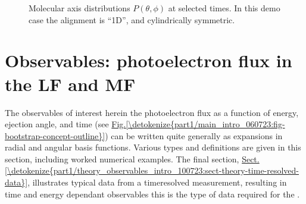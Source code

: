\documentclass[letterpaper,table,10pt,english]{jupyterBook}
\begin{document}
\begin{figure}[htbp]
\centering
\capstart

\noindent{}
\caption{Molecular axis distributions \(P(\theta,\phi)\) at selected times. In this demo case the alignment is “1D”, and cylindrically symmetric.}\label{\detokenize{part1/theory_molecular_alignment_170723:fig-axisdistdemo}}\end{figure}

\sphinxstepscope


\section{Observables: photoelectron flux in the LF and MF}
\label{\detokenize{part1/theory_observables_intro_100723:observables-photoelectron-flux-in-the-lf-and-mf}}\label{\detokenize{part1/theory_observables_intro_100723:sect-theory-observables}}\label{\detokenize{part1/theory_observables_intro_100723::doc}}
\sphinxAtStartPar
The observables of interest herein \sphinxhyphen{} the photoelectron flux as a function of energy, ejection angle, and time (see \hyperref[\detokenize{part1/main_intro_060723:fig-bootstrap-concept-outline}]{Fig.\@ \ref{\detokenize{part1/main_intro_060723:fig-bootstrap-concept-outline}}}) \sphinxhyphen{} can be written quite generally as expansions in radial and angular basis functions. Various types and definitions are given in this section, including worked numerical examples. The final section, \hyperref[\detokenize{part1/theory_observables_intro_100723:sect-theory-time-resolved-data}]{Sect.\@ \ref{\detokenize{part1/theory_observables_intro_100723:sect-theory-time-resolved-data}}}, illustrates typical data from a time\sphinxhyphen{}resolved measurement, resulting in time and energy dependant observables \sphinxhyphen{} this is the type of data required for the {\hyperref[\detokenize{backmatter/glossary:term-bootstrap-retrieval-protocol}]{}}.
\end{document}
